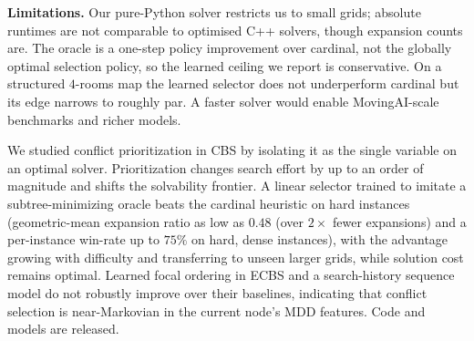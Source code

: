 \documentclass{article}
\theoremstyle{plain}
\theoremstyle{definition}
\theoremstyle{remark}
\newcommand{\linHardWin}{geometric-mean expansion ratio as low as $0.48$ (over
$2\times$ fewer expansions) and a per-instance win-rate up to $75\%$ on hard,
dense instances}
\begin{document}
\textbf{Limitations.} Our pure-Python solver restricts us to small grids;
absolute runtimes are not comparable to optimised C++ solvers, though expansion
counts are. The oracle is a one-step policy improvement over cardinal, not the
globally optimal selection policy, so the learned ceiling we report is
conservative. On a structured $4$-rooms map the learned selector does not
underperform cardinal but its edge narrows to roughly par. A faster solver would
enable MovingAI-scale benchmarks and richer models.

\vspace{-6pt}
We studied conflict prioritization in CBS by isolating it as the single variable
on an optimal solver. Prioritization changes search effort by up to an order of
magnitude and shifts the solvability frontier. A linear selector trained to
imitate a subtree-minimizing oracle beats the cardinal heuristic on hard
instances (\linHardWin{}), with the advantage growing with difficulty and
transferring to unseen larger grids, while solution cost remains optimal. Learned
focal ordering in ECBS and a search-history sequence model do not robustly
improve over their baselines, indicating that conflict selection is near-Markovian
in the current node's MDD features. Code and models are released.




\end{document}
